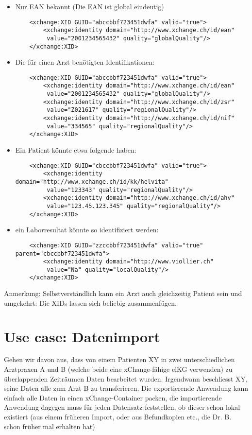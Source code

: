 \documentclass[a4paper]{scrartcl}
\begin{document}
\begin{itemize}
\item Nur EAN bekannt (Die EAN ist global eindeutig)
\begin{verbatim}
    <xchange:XID GUID="abccbbf723451dwfa" valid="true">
        <xchange:identity domain="http://www.xchange.ch/id/ean"
         value="2001234565432" quality="globalQuality"/>
    </xchange:XID>
\end{verbatim}
   
\item Die für einen Arzt benötigten Identifikationen:
\begin{verbatim}
    <xchange:XID GUID="abccbbf723451dwfa" valid="true">
        <xchange:identity domain="http://www.xchange.ch/id/ean"
         value="2001234565432" quality="globalQuality"/>
        <xchange:identity domain="http://www.xchange.ch/id/zsr"
         value="Z021617" quality="regionalQuality"/>
        <xchange:identity domain="http://www.xchange.ch/id/nif"
         value="334565" quality="regionalQuality"/>
    </xchange:XID>
\end{verbatim}

\item Ein Patient könnte etwa folgende haben:
\begin{verbatim}
    <xchange:XID GUID="cbccbbf723451dwfa" valid="true">
        <xchange:identity domain="http://www.xchange.ch/id/kk/helvita"
         value="123343" quality="regionalQuality"/>
        <xchange:identity domain="http://www.xchange.ch/id/ahv"
         value="123.45.123.345" quality="regionalQuality"/>
    </xchange:XID>
\end{verbatim}

\item ein Laborresultat könnte so identifiziert werden:
\begin{verbatim}
    <xchange:XID GUID="zzccbbf723451dwfa" valid="true" parent="cbccbbf723451dwfa">
        <xchange:identity domain="http://www.viollier.ch"
         value="Na" quality="localQuality"/>
    </xchange:XID>
\end{verbatim}

\end{itemize}

Anmerkung: Selbstverständlich kann ein Arzt auch gleichzeitig Patient sein und umgekehrt: Die XIDs lassen sich beliebig zusammenfügen.

\section{Use case: Datenimport}
Gehen wir davon aus, dass von einem Patienten XY in zwei unterschiedlichen Arztpraxen A und B (welche beide eine xChange-fähige elKG verwenden) zu überlappenden Zeiträumen Daten bearbeitet wurden. Irgendwann beschliesst XY, seine Daten alle zum Arzt B zu transferieren. Die exportierende Anwendung kann einfach alle Daten in einen xChange-Container packen, die importierende Anwendung dagegen muss für jeden Datensatz feststellen, ob dieser schon lokal existiert (aus einem früheren Import, oder aus Befundkopien etc., die Dr. B. schon früher mal erhalten hat)
\end{document}
